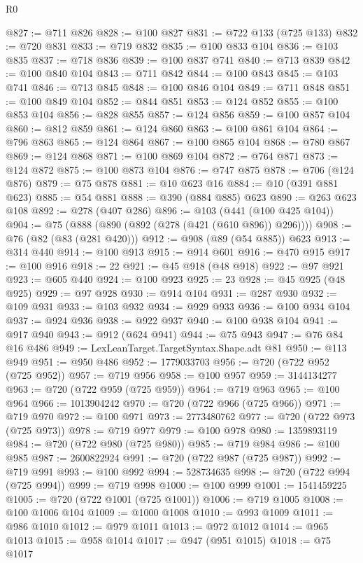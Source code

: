 \begin{lexlean}{R0}
\begin{coremodule}
@827 := @711 @826
@828 := @100 @827
@831 := @722 @133 (@725 @133)
@832 := @720 @831
@833 := @719 @832
@835 := @100 @833 @104
@836 := @103 @835
@837 := @718 @836
@839 := @100 @837 @741
@840 := @713 @839
@842 := @100 @840 @104
@843 := @711 @842
@844 := @100 @843
@845 := @103 @741
@846 := @713 @845
@848 := @100 @846 @104
@849 := @711 @848
@851 := @100 @849 @104
@852 := @844 @851
@853 := @124 @852
@855 := @100 @853 @104
@856 := @828 @855
@857 := @124 @856
@859 := @100 @857 @104
@860 := @812 @859
@861 := @124 @860
@863 := @100 @861 @104
@864 := @796 @863
@865 := @124 @864
@867 := @100 @865 @104
@868 := @780 @867
@869 := @124 @868
@871 := @100 @869 @104
@872 := @764 @871
@873 := @124 @872
@875 := @100 @873 @104
@876 := @747 @875
@878 := @706 (@124 @876)
@879 := @75 @878
@881 := @10 @623 @16
@884 := @10 (@391 @881 @623)
@885 := @54 @881
@888 := @390 (@884 @885) @623
@890 := @263 @623 @108
@892 := @278 (@407 @286)
@896 := @103 (@441 (@100 @425 @104))
@904 := @75 (@888 (@890 (@892 (@278 (@421 (@610 @896)) @296))))
@908 := @76 (@82 (@83 (@281 @420)))
@912 := @908 (@89 (@54 @885)) @623
@913 := @314 @440
@914 := @100 @913
@915 := @914 @601
@916 := @470 @915
@917 := @100 @916
@918 := 22
@921 := @45 @918 (@48 @918)
@922 := @97 @921
@923 := @605 @440
@924 := @100 @923
@925 := 23
@928 := @45 @925 (@48 @925)
@929 := @97 @928
@930 := @914 @104
@931 := @287 @930
@932 := @109 @931
@933 := @103 @932
@934 := @929 @933
@936 := @100 @934 @104
@937 := @924 @936
@938 := @922 @937
@940 := @100 @938 @104
@941 := @917 @940
@943 := @912 (@624 @941)
@944 := @75 @943
@947 := @76 @84 @16 @486
@949 := LexLeanTarget.TargetSyntax.Shape.adt @81
@950 := @113 @949
@951 := @950 @486
@952 := 1779033703
@956 := @720 (@722 @952 (@725 @952))
@957 := @719 @956
@958 := @100 @957
@959 := 3144134277
@963 := @720 (@722 @959 (@725 @959))
@964 := @719 @963
@965 := @100 @964
@966 := 1013904242
@970 := @720 (@722 @966 (@725 @966))
@971 := @719 @970
@972 := @100 @971
@973 := 2773480762
@977 := @720 (@722 @973 (@725 @973))
@978 := @719 @977
@979 := @100 @978
@980 := 1359893119
@984 := @720 (@722 @980 (@725 @980))
@985 := @719 @984
@986 := @100 @985
@987 := 2600822924
@991 := @720 (@722 @987 (@725 @987))
@992 := @719 @991
@993 := @100 @992
@994 := 528734635
@998 := @720 (@722 @994 (@725 @994))
@999 := @719 @998
@1000 := @100 @999
@1001 := 1541459225
@1005 := @720 (@722 @1001 (@725 @1001))
@1006 := @719 @1005
@1008 := @100 @1006 @104
@1009 := @1000 @1008
@1010 := @993 @1009
@1011 := @986 @1010
@1012 := @979 @1011
@1013 := @972 @1012
@1014 := @965 @1013
@1015 := @958 @1014
@1017 := @947 (@951 @1015)
@1018 := @75 @1017

\end{coremodule}
\end{lexlean}
